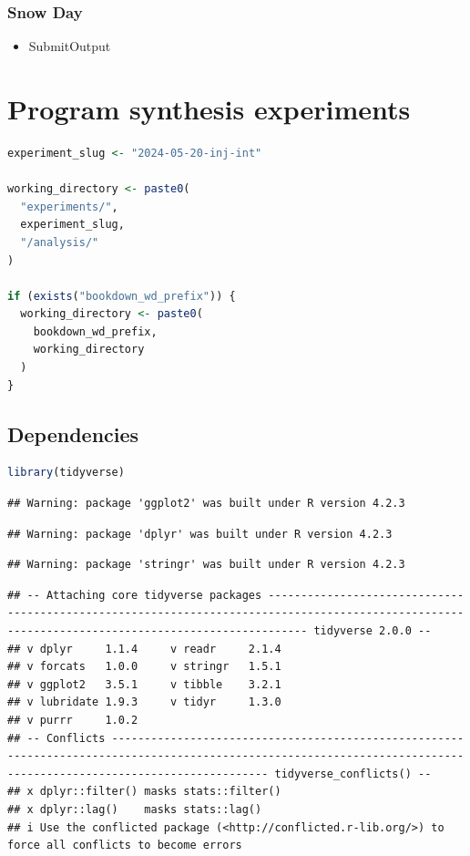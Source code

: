 \documentclass[
]{book}
\providecommand{\tightlist}{%
  \setlength{\itemsep}{0pt}\setlength{\parskip}{0pt}}
\begin{document}
\hypertarget{snow-day}{%
\subsection{Snow Day}\label{snow-day}}

\begin{itemize}
\tightlist
\item
  SubmitOutput
\end{itemize}

\hypertarget{program-synthesis-experiments}{%
\chapter{Program synthesis experiments}\label{program-synthesis-experiments}}

\begin{lstlisting}[language=R]
experiment_slug <- "2024-05-20-inj-int"

working_directory <- paste0(
  "experiments/",
  experiment_slug,
  "/analysis/"
)

if (exists("bookdown_wd_prefix")) {
  working_directory <- paste0(
    bookdown_wd_prefix,
    working_directory
  )
}
\end{lstlisting}

\hypertarget{dependencies}{%
\section{Dependencies}\label{dependencies}}

\begin{lstlisting}[language=R]
library(tidyverse)
\end{lstlisting}

\begin{lstlisting}
## Warning: package 'ggplot2' was built under R version 4.2.3
\end{lstlisting}

\begin{lstlisting}
## Warning: package 'dplyr' was built under R version 4.2.3
\end{lstlisting}

\begin{lstlisting}
## Warning: package 'stringr' was built under R version 4.2.3
\end{lstlisting}

\begin{lstlisting}
## -- Attaching core tidyverse packages -------------------------------------------------------------------------------------------------------------------------------------------------- tidyverse 2.0.0 --
## v dplyr     1.1.4     v readr     2.1.4
## v forcats   1.0.0     v stringr   1.5.1
## v ggplot2   3.5.1     v tibble    3.2.1
## v lubridate 1.9.3     v tidyr     1.3.0
## v purrr     1.0.2     
## -- Conflicts -------------------------------------------------------------------------------------------------------------------------------------------------------------------- tidyverse_conflicts() --
## x dplyr::filter() masks stats::filter()
## x dplyr::lag()    masks stats::lag()
## i Use the conflicted package (<http://conflicted.r-lib.org/>) to force all conflicts to become errors
\end{lstlisting}
\end{document}
